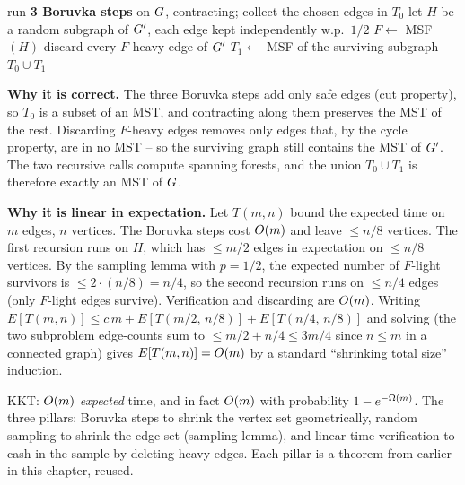 \begin{algorithm}[H]
\caption{KKT randomized MST (expected $\Oh(m)$)}
\label{ch06:kkt}
run \textbf{3 Boruvka steps} on $G$, contracting; collect the chosen edges in $T_0$\;
let $H$ be a random subgraph of $G'$, each edge kept independently w.p.\ $1/2$\;
$F\gets$ MSF$(H)$ 
discard every $F$-heavy edge of $G'$ 
$T_1\gets$ MSF of the surviving subgraph 
\Return $T_0\cup T_1$\;
\end{algorithm}

\begin{whybox}
\textbf{Why it is correct.} The three Boruvka steps add only safe edges (cut property), so $T_0$ is a subset of an MST, and contracting along them preserves the MST of the rest. Discarding $F$-heavy edges removes only edges that, by the cycle property, are in no MST -- so the surviving graph still contains the MST of $G'$. The two recursive calls compute spanning forests, and the union $T_0\cup T_1$ is therefore exactly an MST of $G$.

\textbf{Why it is linear in expectation.} Let $T(m,n)$ bound the expected time on $m$ edges, $n$ vertices. The Boruvka steps cost $\Oh(m)$ and leave $\le n/8$ vertices. The first recursion runs on $H$, which has $\le m/2$ edges in expectation on $\le n/8$ vertices. By the sampling lemma with $p=1/2$, the expected number of $F$-light survivors is $\le 2\cdot(n/8)=n/4$, so the second recursion runs on $\le n/4$ edges (only $F$-light edges survive). Verification and discarding are $\Oh(m)$. Writing $E[T(m,n)]\le c\,m + E[T(m/2,\,n/8)] + E[T(n/4,\,n/8)]$ and solving (the two subproblem edge-counts sum to $\le m/2 + n/4 \le 3m/4$ since $n\le m$ in a connected graph) gives $E[T(m,n)]=O(m)$ by a standard ``shrinking total size'' induction.
\end{whybox}

\begin{complexitybox}
KKT: $\Oh(m)$ \emph{expected} time, and in fact $\Oh(m)$ with probability $1-e^{-\Omega(m)}$. The three pillars: Boruvka steps to shrink the vertex set geometrically, random sampling to shrink the edge set (sampling lemma), and linear-time verification to cash in the sample by deleting heavy edges. Each pillar is a theorem from earlier in this chapter, reused.
\end{complexitybox}

